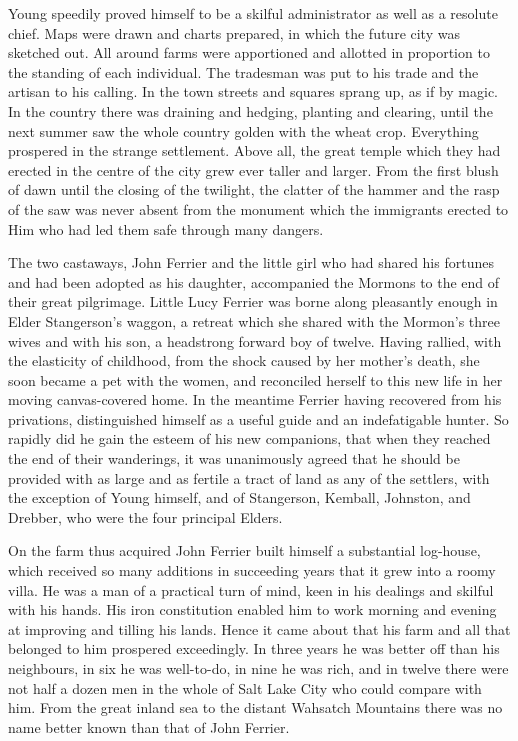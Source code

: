 \documentclass[12pt,english,oneside]{book}
\begin{document}
Young speedily proved himself to be a skilful administrator as well
as a resolute chief. Maps were drawn and charts prepared, in which
the future city was sketched out. All around farms were apportioned
and allotted in proportion to the standing of each individual. The
tradesman was put to his trade and the artisan to his calling. In
the town streets and squares sprang up, as if by magic. In the country
there was draining and hedging, planting and clearing, until the next
summer saw the whole country golden with the wheat crop. Everything
prospered in the strange settlement. Above all, the great temple which
they had erected in the centre of the city grew ever taller and larger.
From the first blush of dawn until the closing of the twilight, the
clatter of the hammer and the rasp of the saw was never absent from
the monument which the immigrants erected to Him who had led them
safe through many dangers.

The two castaways, John Ferrier and the little girl who had shared
his fortunes and had been adopted as his daughter, accompanied the
Mormons to the end of their great pilgrimage. Little Lucy Ferrier
was borne along pleasantly enough in Elder Stangerson's waggon, a
retreat which she shared with the Mormon's three wives and with his
son, a headstrong forward boy of twelve. Having rallied, with the
elasticity of childhood, from the shock caused by her mother's death,
she soon became a pet with the women, and reconciled herself to this
new life in her moving canvas-covered home. In the meantime Ferrier
having recovered from his privations, distinguished himself as a useful
guide and an indefatigable hunter. So rapidly did he gain the esteem
of his new companions, that when they reached the end of their wanderings,
it was unanimously agreed that he should be provided with as large
and as fertile a tract of land as any of the settlers, with the exception
of Young himself, and of Stangerson, Kemball, Johnston, and Drebber,
who were the four principal Elders.

On the farm thus acquired John Ferrier built himself a substantial
log-house, which received so many additions in succeeding years that
it grew into a roomy villa. He was a man of a practical turn of mind,
keen in his dealings and skilful with his hands. His iron constitution
enabled him to work morning and evening at improving and tilling his
lands. Hence it came about that his farm and all that belonged to
him prospered exceedingly. In three years he was better off than his
neighbours, in six he was well-to-do, in nine he was rich, and in
twelve there were not half a dozen men in the whole of Salt Lake City
who could compare with him. From the great inland sea to the distant
Wahsatch Mountains there was no name better known than that of John
Ferrier.
\end{document}
